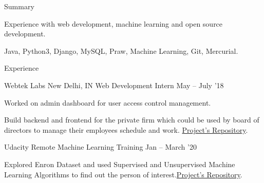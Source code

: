 \documentclass{resume} %
\begin{document}

\begin{rSection}{Summary}
  \begin{rSummarySection}
  {
    \item Experience with web development, machine learning and open source development.
    \item Java, Python3, Django, MySQL, Praw, Machine Learning, Git, Mercurial.
  }
  \end{rSummarySection}
\end{rSection}


\begin{rSection}{Experience}
  \begin{rWorkSection}{Webtek Labs}
                           {New Delhi, IN}
                           {Web Development Intern}
                           {May -- July '18}
  {
    \item Worked on admin dashboard for user access control management.
    \item Build backend and frontend for the private firm which could be used by board of directors to manage their employees schedule and work. \href{https://github.com/siddhi523/WebTek}{Project's Repository}.
  }
  \end{rWorkSection}


  \begin{rWorkSection}{Udacity}
                     {Remote}
                     {Machine Learning Training}
                     {Jan -- March '20}
  {
    \item Explored Enron Dataset and used Supervised and Unsupervised Machine Learning 
          Algorithms to find out the person of interest.\href{https://github.com/siddhi523/ud120-projects}{Project's Repository}.
  }
  \end{rWorkSection}
\end{rSection}

\end{document}
